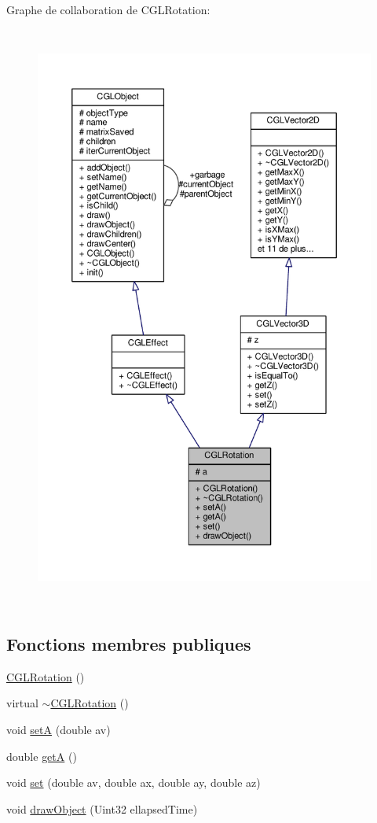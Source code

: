 Graphe de collaboration de C\-G\-L\-Rotation\-:
\nopagebreak
\begin{figure}[H]
\begin{center}
\leavevmode
\includegraphics[height=550pt]{d0/db1/class_c_g_l_rotation__coll__graph}
\end{center}
\end{figure}
\subsection*{Fonctions membres publiques}
\begin{DoxyCompactItemize}
\item 
\hyperlink{class_c_g_l_rotation_a00f328e9aeefa148e4bd169afc5cb959}{C\-G\-L\-Rotation} ()
\item 
virtual \hyperlink{class_c_g_l_rotation_adc90213d4008b9beb3c8e266f952a509}{$\sim$\-C\-G\-L\-Rotation} ()
\item 
void \hyperlink{class_c_g_l_rotation_a690f30f8f121b27ac22d6b02a6443b58}{set\-A} (double av)
\item 
double \hyperlink{class_c_g_l_rotation_a0d836220b7b39ee00173ee4e0bb4da92}{get\-A} ()
\item 
void \hyperlink{class_c_g_l_rotation_a2b767e088f36ceef91e7259c76f7390e}{set} (double av, double ax, double ay, double az)
\item 
void \hyperlink{class_c_g_l_rotation_a94be2c089fbe52d0f8cb33ee98f8de74}{draw\-Object} (Uint32 ellapsed\-Time)
\end{DoxyCompactItemize}

